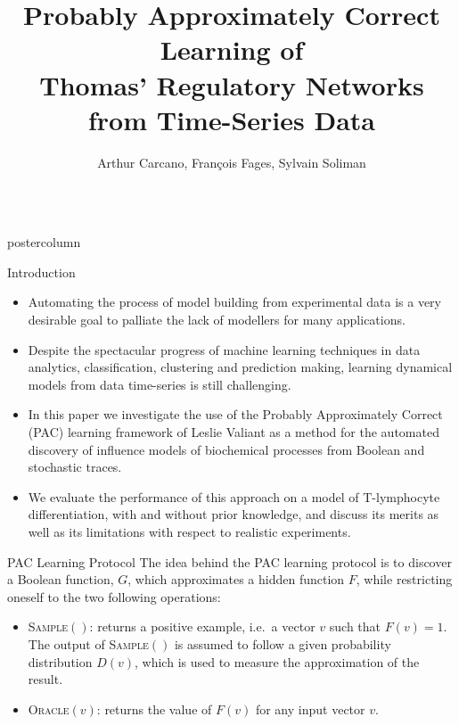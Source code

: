 \documentclass[final,hyperref={pdfpagelabels=false},xcolor=dvipsnames]{beamer}
\title{Probably Approximately Correct Learning of\\ Thomas' Regulatory Networks from Time-Series Data}
\author{Arthur Carcano, Fran\c{c}ois Fages, Sylvain Soliman}
\institute[Inria, Universit\'e Paris Saclay]{EP Lifeware, Inria, Universit\'e Paris Saclay, France}
\newlength{\columnheight}
\begin{document}
\begin{frame}
  \begin{columns}
    \begin{column}{.49\textwidth}
      \begin{beamercolorbox}[center,wd=\textwidth]{postercolumn}
        \begin{minipage}[T]{.95\textwidth}  %
          \parbox[t][\columnheight]{\textwidth}{ %
            \begin{block}{Introduction}
              \begin{itemize}
              \item Automating the process of model building from experimental data 
is a very desirable goal to palliate the lack of modellers for many applications.
\item Despite the spectacular progress of machine learning techniques in data analytics, classification, clustering and prediction making,
learning dynamical models from data time-series is still challenging.
\item In this paper \cite{CFS17cmsb} we investigate the use of the Probably Approximately Correct (PAC) learning 
framework of Leslie Valiant as a method for the automated discovery of influence models of biochemical processes from Boolean and stochastic traces. 
\item We evaluate the performance of this approach on a model of T-lymphocyte
differentiation, with and without prior knowledge,
and discuss its merits as well as its limitations with respect to realistic experiments.
              \end{itemize}              
            \end{block}
            \vfill
            \begin{block}{PAC Learning Protocol}
The idea behind the PAC learning protocol is to discover a Boolean
function, $G$, which approximates a hidden function $F$, while restricting oneself to the two following operations:
\begin{itemize}
  \item
\textsc{Sample}$()$: returns a positive example, i.e.~a vector $v$ such that $F(v)=1$.
The output of \textsc{Sample}$()$ is assumed to follow a given probability distribution $D(v)$, which is used to measure the approximation of the result.
  \item
\textsc{Oracle}$(v)$: returns the value of $F(v)$ for any input vector $v$.
\end{itemize}


\end{block}}
\end{minipage}
\end{beamercolorbox}
\end{column}
\end{columns}
\end{frame}
\end{document}
